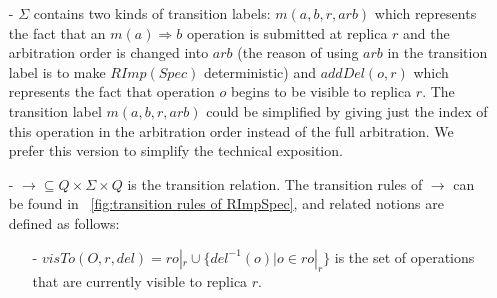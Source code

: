 \begin{itemize}
\item[-] $\Sigma$ contains two kinds of transition labels: $m(a,b,r,\mathit{arb})$ which represents the fact that an $m(a) \Rightarrow b$ operation is submitted at replica $r$ and the arbitration order is changed into $\mathit{arb}$ (the reason of using $\mathit{arb}$ in the transition label is to make $\mathit{RImp}(\mathit{Spec})$ deterministic) and $\mathit{addDel}(o,r)$ which represents the fact that operation $o$ begins to be visible to replica $r$. The transition label $m(a,b,r,\mathit{arb})$ could be simplified by giving just the index of this operation in the arbitration order instead of the full arbitration. We prefer this version to simplify the technical exposition.


\item[-] $\rightarrow \subseteq Q \times \Sigma \times Q$ is the transition relation. The transition rules of $\rightarrow$ can be found in \figurename~\ref{fig:transition rules of RImpSpec}, and related notions are defined as follows:


    \begin {itemize}


    \item[-] $\mathit{visTo}(O,r,\mathit{del}) = \mathit{ro}|_r\cup \{ \mathit{del}^{-1}(o) \vert o \in \mathit{ro}|_r \} $ is the set of operations that are currently visible to replica $r$.



\end{itemize}
\end{itemize}
